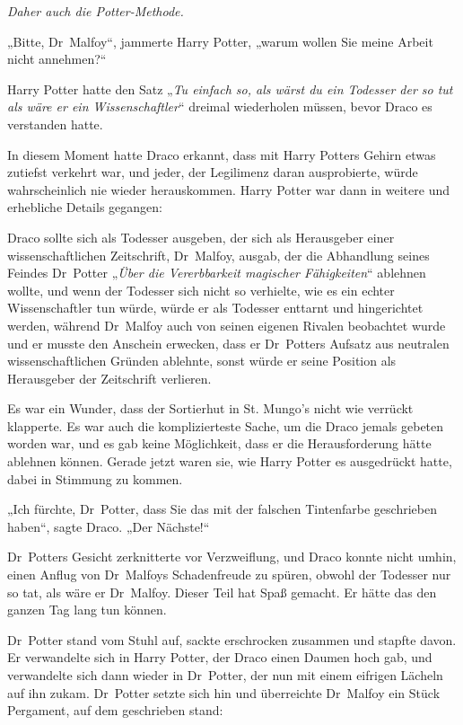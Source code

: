 {\emph{Daher auch die Potter-Methode.}

„Bitte, Dr~Malfoy“, jammerte Harry Potter, „warum wollen Sie meine Arbeit nicht annehmen?“

Harry Potter hatte den Satz „\emph{Tu einfach so, als wärst du ein Todesser der so tut als wäre er ein Wissenschaftler}“ dreimal wiederholen müssen, bevor Draco es verstanden hatte.

In diesem Moment hatte Draco erkannt, dass mit Harry Potters Gehirn etwas zutiefst verkehrt war, und jeder, der Legilimenz daran ausprobierte, würde wahrscheinlich nie wieder herauskommen. Harry Potter war dann in weitere und erhebliche Details gegangen:

Draco sollte sich als Todesser ausgeben, der sich als Herausgeber einer wissenschaftlichen Zeitschrift, Dr~Malfoy, ausgab, der die Abhandlung seines Feindes Dr~Potter „\emph{Über die Vererbbarkeit magischer Fähigkeiten}“ ablehnen wollte, und wenn der Todesser sich nicht so verhielte, wie es ein echter Wissenschaftler tun würde, würde er als Todesser enttarnt und hingerichtet werden, während Dr~Malfoy auch von seinen eigenen Rivalen beobachtet wurde und er musste den Anschein erwecken, dass er Dr~Potters Aufsatz aus neutralen wissenschaftlichen Gründen ablehnte, sonst würde er seine Position als Herausgeber der Zeitschrift verlieren.

Es war ein Wunder, dass der Sortierhut in St. Mungo's nicht wie verrückt klapperte. Es war auch die komplizierteste Sache, um die Draco jemals gebeten worden war, und es gab keine Möglichkeit, dass er die Herausforderung hätte ablehnen können. Gerade jetzt waren sie, wie Harry Potter es ausgedrückt hatte, dabei in Stimmung zu kommen.

„Ich fürchte, Dr~Potter, dass Sie das mit der falschen Tintenfarbe geschrieben haben“, sagte Draco. „Der Nächste!“

Dr~Potters Gesicht zerknitterte vor Verzweiflung, und Draco konnte nicht umhin, einen Anflug von Dr~Malfoys Schadenfreude zu spüren, obwohl der Todesser nur so tat, als wäre er Dr~Malfoy. Dieser Teil hat Spaß gemacht. Er hätte das den ganzen Tag lang tun können.

Dr~Potter stand vom Stuhl auf, sackte erschrocken zusammen und stapfte davon. Er verwandelte sich in Harry Potter, der Draco einen Daumen hoch gab, und verwandelte sich dann wieder in Dr~Potter, der nun mit einem eifrigen Lächeln auf ihn zukam. Dr~Potter setzte sich hin und überreichte Dr~Malfoy ein Stück Pergament, auf dem geschrieben stand:

}

